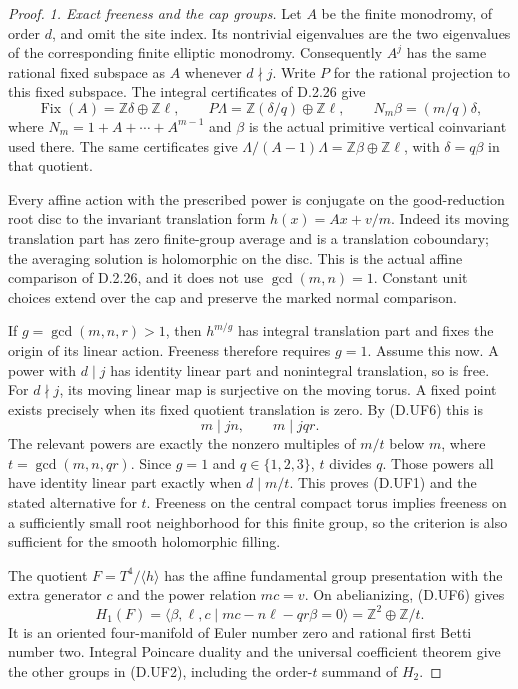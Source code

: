 \begin{proof}
\emph{1. Exact freeness and the cap groups.}
Let $A$ be the finite monodromy, of order $d$, and omit the
site index. Its nontrivial eigenvalues are the two eigenvalues
of the corresponding finite elliptic monodromy. Consequently
$A^j$ has the same rational fixed subspace as $A$ whenever
$d\nmid j$. Write $P$ for the rational projection to this fixed
subspace. The integral certificates of D.2.26 give
\[
 \operatorname{Fix}(A)=\mathbb Z\delta\oplus\mathbb Z\ell,
 \qquad P\Lambda=\mathbb Z(\delta/q)\oplus\mathbb Z\ell,
 \qquad N_m\beta=(m/q)\delta,                               \tag{D.UF6}
\]
where $N_m=1+A+\cdots+A^{m-1}$ and $\beta$ is the actual
primitive vertical coinvariant used there. The same certificates
give
$\Lambda/(A-1)\Lambda=\mathbb Z\beta\oplus\mathbb Z\ell$,
with $\delta=q\beta$ in that quotient.

Every affine action with the prescribed power is conjugate
on the good-reduction root disc to the invariant translation
form $h(x)=Ax+v/m$. Indeed its moving translation part has
zero finite-group average and is a translation coboundary;
the averaging solution is holomorphic on the disc. This is
the actual affine comparison of D.2.26, and it does not use
$\gcd(m,n)=1$. Constant unit choices extend over the cap and
preserve the marked normal comparison.

If $g=\gcd(m,n,r)>1$, then $h^{m/g}$ has integral translation
part and fixes the origin of its linear action. Freeness
therefore requires $g=1$. Assume this now. A power with
$d\mid j$ has identity linear part and nonintegral translation,
so is free. For $d\nmid j$, its moving linear map is surjective
on the moving torus. A fixed point exists precisely when its
fixed quotient translation is zero. By (D.UF6) this is
\[
 m\mid jn,\qquad m\mid jqr.
\]
The relevant powers are exactly the nonzero multiples of
$m/t$ below $m$, where $t=\gcd(m,n,qr)$. Since $g=1$ and
$q\in\{1,2,3\}$, $t$ divides $q$. Those powers all have
identity linear part exactly when $d\mid m/t$. This proves
(D.UF1) and the stated alternative for $t$. Freeness on the
central compact torus implies freeness on a sufficiently small
root neighborhood for this finite group, so the criterion is
also sufficient for the smooth holomorphic filling.

The quotient $F=T^4/\langle h\rangle$ has the affine fundamental
group presentation with the extra generator $c$ and the power
relation $mc=v$. On abelianizing, (D.UF6) gives
\[
 H_1(F)=\langle\beta,\ell,c\mid
                   mc-n\ell-qr\beta=0\rangle
        =\mathbb Z^2\oplus\mathbb Z/t.                     \tag{D.UF7}
\]
It is an oriented four-manifold of Euler number zero and
rational first Betti number two. Integral Poincare duality and
the universal coefficient theorem give the other groups in
(D.UF2), including the order-$t$ summand of $H_2$.


\end{proof}
